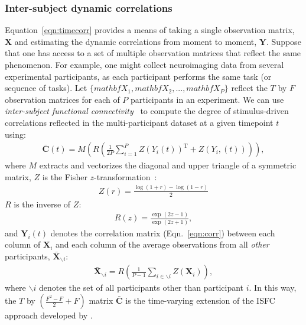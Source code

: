 \documentclass[english]{article}
\begin{document}
\subsubsection*{Inter-subject dynamic correlations}
Equation~\ref{eqn:timecorr} provides a means of taking a single
observation matrix, $\mathbf{X}$ and estimating the dynamic
correlations from moment to moment, $\mathbf{Y}$.  Suppose that one
has access to a set of multiple observation matrices that reflect the
same phenomenon.  For example, one might collect neuroimaging data
from several experimental participants, as each participant performs
the same task (or sequence of tasks).  Let $\{ mathbf{X}_1,
mathbf{X}_2, ..., mathbf{X}_P\}$ reflect the $T$ by $F$ observation
matrices for each of $P$ participants in an experiment.  We can use
\textit{inter-subject functional connectivity}~\citep[ISFC;
][]{SimoEtal16} to compute the degree of stimulus-driven correlations
reflected in the multi-participant dataset at a given timepoint $t$
using:
\begin{align}
\bar{\mathbf{C}}(t) = M\left(R\left(\frac{1}{2P} \sum_{i=1}^P
  Z\left(Y_i(t)\right)^\mathrm{T} + Z\left(Y_i,(t)\right)\right)\right),
\end{align}
where $M$ extracts and vectorizes the diagonal and upper triangle of a symmetric
matrix, $Z$ is the Fisher $z$-transformation~\citep{Zar10}:
\begin{align}
Z(r) = \frac{\log(1+r) - \log(1-r)}{2}
\end{align}
$R$ is the inverse of $Z$:
\begin{align}
R(z) = \frac{\exp(2z - 1)}{\exp(2z + 1)},
\end{align}
and $\mathbf{Y}_i(t)$ denotes the correlation matrix
(Eqn.~\ref{eqn:corr}) between each column of $\mathbf{X}_i$ and each
column of the average observations from all \textit{other}
participants, $\bar{\mathbf{X}}_{ \backslash i}$:
\begin{align}
  \bar{\mathbf{X}}_{ \backslash i} = R\left(\frac{1}{P-1}\sum_{i \in
  \backslash i} Z\left( \mathbf{X}_i \right) \right),
\end{align}
where $ \backslash i$ denotes the set of all participants other than
participant $i$. In this way, the $T$ by $\left( \frac{F^2 - F}{2}
  + F \right)$
matrix $\bar{\mathbf{C}}$ is the time-varying extension of the ISFC
approach developed by \cite{SimoEtal16}.
\end{document}
